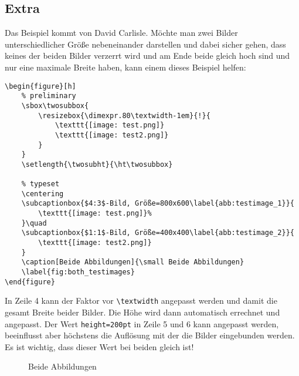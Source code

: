 \subsection{Extra}
Das Beispiel kommt von David Carlisle\cite{DavidCarlisle}.
Möchte man zwei Bilder unterschiedlicher Größe nebeneinander darstellen und dabei sicher gehen, dass keines der beiden Bilder verzerrt wird und am Ende beide gleich hoch sind und nur eine maximale Breite haben, kann einem dieses Beispiel helfen:

\begin{lstlisting}[style=latex]
\begin{figure}[h]
	% preliminary
	\sbox\twosubbox{
		\resizebox{\dimexpr.80\textwidth-1em}{!}{
			\texttt{[image: test.png]}
			\texttt{[image: test2.png]}
		}
	}
	\setlength{\twosubht}{\ht\twosubbox}
	
	% typeset
	\centering
	\subcaptionbox{$4:3$-Bild, Größe=800x600\label{abb:testimage_1}}{
		\texttt{[image: test.png]}%
	}\quad
	\subcaptionbox{$1:1$-Bild, Größe=400x400\label{abb:testimage_2}}{
		\texttt{[image: test2.png]}
	}
	\caption[Beide Abbildungen]{\small Beide Abbildungen}
	\label{fig:both_testimages}	
\end{figure}
\end{lstlisting}

In Zeile 4 kann der Faktor vor \verb|\textwidth| angepasst werden und damit die gesamt Breite beider Bilder. Die Höhe wird dann automatisch errechnet und angepasst. Der Wert \verb|height=200pt| in Zeile 5 und 6 kann angepasst werden, beeinflusst aber höchstens die Auflösung mit der die Bilder eingebunden werden. Es ist wichtig, dass dieser Wert bei beiden gleich ist!

\begin{figure}[H]
	\sbox{}
	\setlength{\twosubht}{\ht\twosubbox}
	
	\centering
	\quad
	
	\caption[Beide Abbildungen]{\small Beide Abbildungen}
	\label{fig:both_testimages}	
\end{figure}

